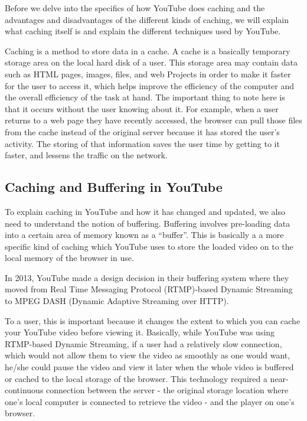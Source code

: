 Before we delve into the specifics of how YouTube does caching and the advantages and disadvantages of the different kinds of caching, we will explain what caching itself is and explain the different techniques used by YouTube.

Caching is a method to store data in a cache. A cache is a basically temporary storage area on the local hard disk of a user. This storage area may contain data such as HTML pages, images, files, and web Projects in order to make it faster for the user to access it, which helps improve the efficiency of the computer and the overall efficiency of the task at hand. The important thing to note here is that it occurs without the user knowing about it. For example, when a user returns to a web page they have recently accessed, the browser can pull those files from the cache instead of the original server because it has stored the user's activity. The storing of that information saves the user time by getting to it faster, and lessens the traffic on the network.


\subsection{Caching and Buffering in YouTube}
To explain caching in YouTube and how it has changed and updated, we also need to understand the notion of buffering. Buffering involves pre-loading data  into a certain area of memory known as a ``buffer''. This is basically a a more specific kind of caching which YouTube uses to store the loaded video on to the local memory of the browser in use.

In 2013, YouTube made a design decision in their buffering system where they moved from Real Time Messaging Protocol (RTMP)-based Dynamic Streaming to MPEG DASH (Dynamic Adaptive Streaming over HTTP).

To a user, this is important because it changes the extent to which you can cache your YouTube video before viewing it. Basically, while YouTube was using RTMP-based Dynamic Streaming, if a user had a relatively slow connection, which would not allow them to view the video as smoothly as one would want, he/she could pause the video and view it later when the whole video is buffered or cached to the local storage of the browser. This technology required a near-continuous connection between the server - the original storage location where one's local computer is connected to retrieve the video - and the player on one's browser.

